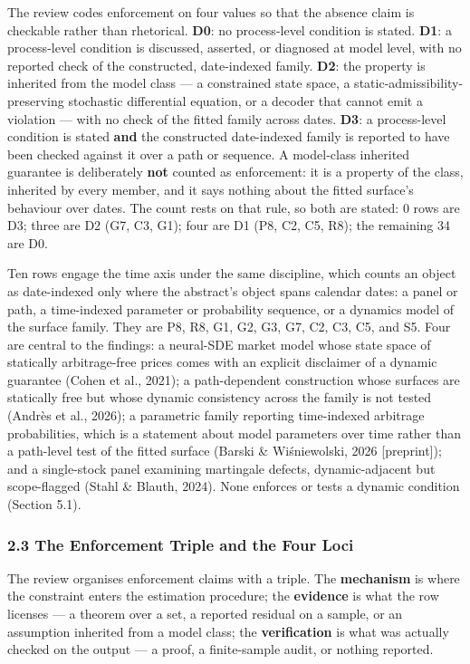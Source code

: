 \documentclass[11pt]{article}
\begin{document}
The review codes enforcement on four values so that the absence claim is checkable rather than rhetorical. \textbf{D0}: no process-level condition is stated. \textbf{D1}: a process-level condition is discussed, asserted, or diagnosed at model level, with no reported check of the constructed, date-indexed family. \textbf{D2}: the property is inherited from the model class — a constrained state space, a static-admissibility-preserving stochastic differential equation, or a decoder that cannot emit a violation — with no check of the fitted family across dates. \textbf{D3}: a process-level condition is stated \textbf{and} the constructed date-indexed family is reported to have been checked against it over a path or sequence. A model-class inherited guarantee is deliberately \textbf{not} counted as enforcement: it is a property of the class, inherited by every member, and it says nothing about the fitted surface's behaviour over dates. The count rests on that rule, so both are stated: 0 rows are D3; three are D2 (G7, C3, G1); four are D1 (P8, C2, C5, R8); the remaining 34 are D0.

Ten rows engage the time axis under the same discipline, which counts an object as date-indexed only where the abstract's object spans calendar dates: a panel or path, a time-indexed parameter or probability sequence, or a dynamics model of the surface family. They are P8, R8, G1, G2, G3, G7, C2, C3, C5, and S5. Four are central to the findings: a neural-SDE market model whose state space of statically arbitrage-free prices comes with an explicit disclaimer of a dynamic guarantee (Cohen et al., 2021); a path-dependent construction whose surfaces are statically free but whose dynamic consistency across the family is not tested (Andrès et al., 2026); a parametric family reporting time-indexed arbitrage probabilities, which is a statement about model parameters over time rather than a path-level test of the fitted surface (Barski \& Wiśniewolski, 2026 [preprint]); and a single-stock panel examining martingale defects, dynamic-adjacent but scope-flagged (Stahl \& Blauth, 2024). None enforces or tests a dynamic condition (Section 5.1).

\subsubsection*{2.3 The Enforcement Triple and the Four Loci}
The review organises enforcement claims with a triple. The \textbf{mechanism} is where the constraint enters the estimation procedure; the \textbf{evidence} is what the row licenses — a theorem over a set, a reported residual on a sample, or an assumption inherited from a model class; the \textbf{verification} is what was actually checked on the output — a proof, a finite-sample audit, or nothing reported.
\end{document}
